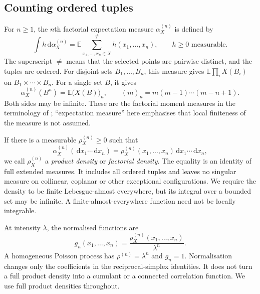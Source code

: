 \documentclass[11pt,a4paper]{article}
\numberwithin{equation}{section}
\theoremstyle{definition}
\theoremstyle{remark}
\newcommand{\E}{\mathbb E}
\newcommand{\dd}{\,\mathrm d}
\begin{document}
\subsection{Counting ordered tuples}

For $n\geq1$, the $n$th factorial expectation measure $\alpha_X^{(n)}$ is
defined by
\begin{equation}
 \int h\dd\alpha_X^{(n)}
 =\E\sum_{x_1,\ldots,x_n\in X}^{\ne} h(x_1,\ldots,x_n),
 \qquad h\geq0\text{ measurable}.
 \label{eq:factorial}
\end{equation}
The superscript $\ne$ means that the selected points are pairwise distinct,
and the tuples are ordered. For disjoint sets $B_1,\ldots,B_n$, this
measure gives $\E\prod_i X(B_i)$ on $B_1\times\cdots\times B_n$.
For a single set $B$, it gives
\begin{equation}
 \alpha_X^{(n)}(B^n)=\E\bigl(X(B)\bigr)_n,
 \qquad (m)_n=m(m-1)\cdots(m-n+1).
 \label{eq:falling}
\end{equation}
Both sides may be infinite. These are the factorial moment measures in
the terminology of \cite[Chapter 9]{DVJ2008}; ``expectation measure''
here emphasises that local finiteness of the measure is not assumed.

If there is a measurable $\rho_X^{(n)}\geq0$ such that
\begin{equation}
 \alpha_X^{(n)}(\dd x_1\cdots\dd x_n)
 =\rho_X^{(n)}(x_1,\ldots,x_n)\dd x_1\cdots\dd x_n,
 \label{eq:product-density}
\end{equation}
we call $\rho_X^{(n)}$ a \emph{product density} or \emph{factorial density}.
The equality is an identity of full extended measures. It includes all
ordered tuples and leaves no singular measure on collinear, coplanar or
other exceptional configurations. We require the density to be finite
Lebesgue-almost everywhere, but its integral over a bounded set may be
infinite. A finite-almost-everywhere function need not be locally
integrable.

At intensity $\lambda$, the normalised functions are
\begin{equation}
 g_n(x_1,\ldots,x_n)
 =\frac{\rho_X^{(n)}(x_1,\ldots,x_n)}{\lambda^n}.
 \label{eq:gn}
\end{equation}
A homogeneous Poisson process has $\rho^{(n)}=\lambda^n$ and $g_n=1$.
Normalisation changes only the coefficients in the reciprocal-simplex
identities. It does not turn a full product density into a cumulant or a
connected correlation function. We use full product densities throughout.
\end{document}
